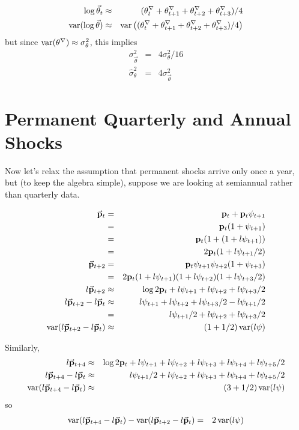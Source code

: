 \documentclass[11pt,letterpaper]{article}
\begin{document}
\begin{eqnarray}
    \log \vec{\theta}_{t} & \approx & (\theta^{\nabla}_{t}+\theta^{\nabla}_{t+1}+\theta^{\nabla}_{t+2}+\theta^{\nabla}_{t+3})/4
\\  \operatorname{var}(\log \vec{\theta}) & \approx & \operatorname{var}\left((\theta^{\nabla}_{t}+\theta^{\nabla}_{t+1}+\theta^{\nabla}_{t+2}+\theta^{\nabla}_{t+3})/4\right)
\end{eqnarray}
but since $\operatorname{var}(\theta^{\nabla}) \approx \sigma_{\theta}^{2}$, this implies
\begin{eqnarray}
  \sigma^{2}_{\vec{\theta}} & = & 4 \sigma^{2}_{\theta}/16
\\ \hat{\sigma}^{2}_{\theta} & = & 4\sigma^{2}_{\vec{\theta}}   \label{eq:varltShkQtr}
\end{eqnarray}

\section{Permanent Quarterly and Annual Shocks}
Now let's relax the assumption that permanent shocks arrive only once a year, but
(to keep the algebra simple), suppose we are looking at semiannual rather than quarterly data.

\begin{eqnarray}
  \vec{\mathbf{p}}_{t} & = & {\mathbf{p}}_{t}+{\mathbf{p}}_{t}\psi_{t+1}
\\ & = & {\mathbf{p}}_{t}(1+\psi_{t+1})
\\ & = & {\mathbf{p}}_{t}(1+(1+l{\psi}_{t+1}))
\\ & = & 2{\mathbf{p}}_{t}(1+l{\psi}_{t+1}/2)
\\ \vec{\mathbf{p}}_{t+2} & = & {\mathbf{p}}_{t}\psi_{t+1}\psi_{t+2}(1+\psi_{t+3})
\\  & = & 2{\mathbf{p}}_{t}(1+l{\psi}_{t+1})(1+l{\psi}_{t+2})(1+l{\psi}_{t+3}/2)
\\ l\vec{\mathbf{p}}_{t+2} & \approx & \log 2{\mathbf{p}}_{t} + l{\psi}_{t+1}+l{\psi}_{t+2}+l{\psi}_{t+3}/2
\\ l\vec{\mathbf{p}}_{t+2} - l\vec{\mathbf{p}}_{t} & \approx & l{\psi}_{t+1}+l{\psi}_{t+2}+l{\psi}_{t+3}/2-l{\psi}_{t+1}/2
\\ & = & l{\psi}_{t+1}/2+l{\psi}_{t+2}+l{\psi}_{t+3}/2
\\ \operatorname{var}(l\vec{\mathbf{p}}_{t+2} - l\vec{\mathbf{p}}_{t}) & \approx & (1+1/2) \operatorname{var}(l{\psi})
\end{eqnarray}

Similarly,
\begin{eqnarray}
    l\vec{\mathbf{p}}_{t+4} & \approx & \log 2{\mathbf{p}}_{t} + l{\psi}_{t+1}+l{\psi}_{t+2}+ l{\psi}_{t+3}+l{\psi}_{t+4}+l{\psi}_{t+5}/2
\\  l\vec{\mathbf{p}}_{t+4}-l\vec{\mathbf{p}}_{t} & \approx & l{\psi}_{t+1}/2+l{\psi}_{t+2}+ l{\psi}_{t+3}+l{\psi}_{t+4}+l{\psi}_{t+5}/2
\\ \operatorname{var}(l\vec{\mathbf{p}}_{t+4}-l\vec{\mathbf{p}}_{t}) & \approx & (3+1/2) \operatorname{var}(l{\psi})
\end{eqnarray}
so 
\begin{eqnarray}
  \operatorname{var}(l\vec{\mathbf{p}}_{t+4}-l\vec{\mathbf{p}}_{t}) - \operatorname{var}(l\vec{\mathbf{p}}_{t+2} - l\vec{\mathbf{p}}_{t}) & = & 2 \operatorname{var}(l{\psi})
\end{eqnarray}
\end{document}
